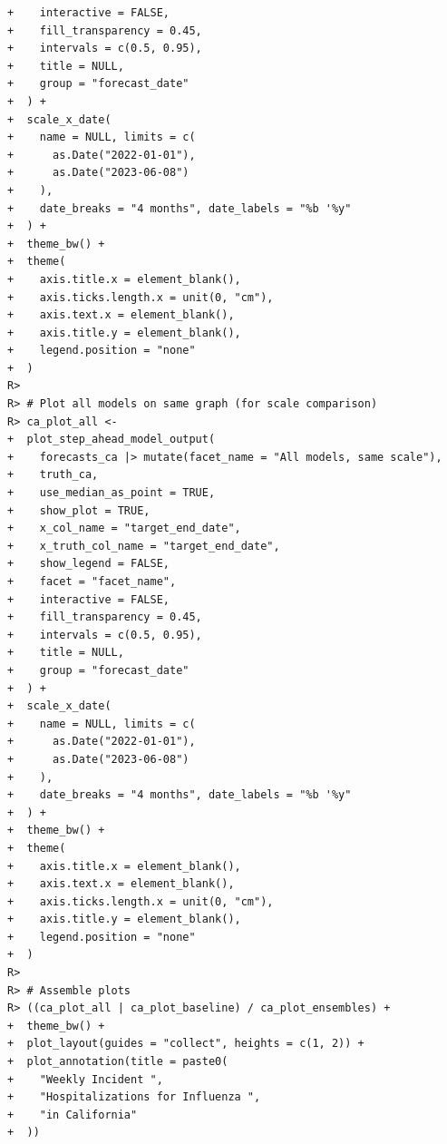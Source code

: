 \documentclass[
  article,
  shortnames,
  notitle]{jss}
\begin{document}
\begin{verbatim}
+    interactive = FALSE,
+    fill_transparency = 0.45,
+    intervals = c(0.5, 0.95),
+    title = NULL,
+    group = "forecast_date"
+  ) +
+  scale_x_date(
+    name = NULL, limits = c(
+      as.Date("2022-01-01"),
+      as.Date("2023-06-08")
+    ),
+    date_breaks = "4 months", date_labels = "%b '%y"
+  ) +
+  theme_bw() +
+  theme(
+    axis.title.x = element_blank(),
+    axis.ticks.length.x = unit(0, "cm"),
+    axis.text.x = element_blank(),
+    axis.title.y = element_blank(),
+    legend.position = "none"
+  )
R> 
R> # Plot all models on same graph (for scale comparison)
R> ca_plot_all <-
+  plot_step_ahead_model_output(
+    forecasts_ca |> mutate(facet_name = "All models, same scale"),
+    truth_ca,
+    use_median_as_point = TRUE,
+    show_plot = TRUE,
+    x_col_name = "target_end_date",
+    x_truth_col_name = "target_end_date",
+    show_legend = FALSE,
+    facet = "facet_name",
+    interactive = FALSE,
+    fill_transparency = 0.45,
+    intervals = c(0.5, 0.95),
+    title = NULL,
+    group = "forecast_date"
+  ) +
+  scale_x_date(
+    name = NULL, limits = c(
+      as.Date("2022-01-01"),
+      as.Date("2023-06-08")
+    ),
+    date_breaks = "4 months", date_labels = "%b '%y"
+  ) +
+  theme_bw() +
+  theme(
+    axis.title.x = element_blank(),
+    axis.text.x = element_blank(),
+    axis.ticks.length.x = unit(0, "cm"),
+    axis.title.y = element_blank(),
+    legend.position = "none"
+  )
R> 
R> # Assemble plots
R> ((ca_plot_all | ca_plot_baseline) / ca_plot_ensembles) +
+  theme_bw() +
+  plot_layout(guides = "collect", heights = c(1, 2)) +
+  plot_annotation(title = paste0(
+    "Weekly Incident ",
+    "Hospitalizations for Influenza ",
+    "in California"
+  ))
\end{verbatim}
\end{document}
